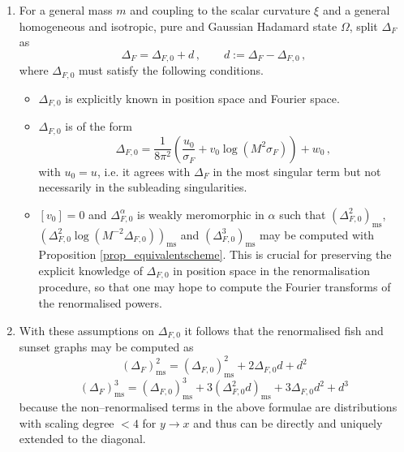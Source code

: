 \documentclass[a4paper,10pt,twoside]{article}
\numberwithin{equation}{section}
\newcounter{and}
\def\ms{\mathrm{ms}}
\def\beq{\begin{equation}}
\def\eeq{\end{equation}}
\theoremstyle{plain}
\theoremstyle{definition}
\begin{document}
\begin{enumerate}
\item For a general mass $m$ and coupling to the scalar curvature $\xi$ and a general homogeneous and isotropic, pure and Gaussian Hadamard state $\Omega$, split $\Delta_F$ as
\beq\label{eq_propagatorsplit}\Delta_F=\Delta_{F,0}+d\,,\qquad d:=\Delta_F-\Delta_{F,0}\,,\eeq
where $\Delta_{F,0}$ must satisfy the following conditions.
\begin{itemize}
\item $\Delta_{F,0}$ is explicitly known in position space and Fourier space.
\item $\Delta_{F,0}$ is of the form
$$\Delta_{F,0}=\frac{1}{8\pi^2}\left(\frac{u_0}{\sigma_F}+v_0\log \left(M^2\sigma_F\right)\right)+w_0\,,$$
with $u_0=u$, i.e. it agrees with $\Delta_F$ in the most singular term but not necessarily in the subleading singularities.
\item $[v_0]=0$ and $\Delta^{\alpha}_{F,0}$ is weakly meromorphic in $\alpha$ such that $\left(\Delta^2_{F,0}\right)_\ms$, $\left(\Delta^2_{F,0}\log \left(M^{-2} \Delta_{F,0}\right)\right)_\ms$ and  $\left(\Delta^3_{F,0}\right)_\ms$ may be computed with Proposition \ref{prop_equivalentscheme}. This is crucial for preserving the explicit knowledge of $\Delta_{F,0}$ in position space in the renormalisation procedure, so that one may hope to compute the Fourier transforms of the renormalised powers.
\end{itemize}

\item With these assumptions on $\Delta_{F,0}$ it follows that the renormalised fish and sunset graphs may be computed as
\beq\label{eq_fishsunsetalt}(\Delta_{F})^2_\ms = (\Delta_{F,0})^2_\ms + 2 \Delta_{F,0} d+ d^2\eeq
$$(\Delta_{F})^3_\ms = (\Delta_{F,0})^3_\ms + 3 \left(\Delta^2_{F,0} d\right)_\ms+ 3  \Delta_{F,0} d^2+ d^3$$
because the non--renormalised terms in the above formulae are distributions with scaling degree $<4$ for $y\to x$ and thus can be directly and uniquely extended to the diagonal.


\end{enumerate}
\end{document}

